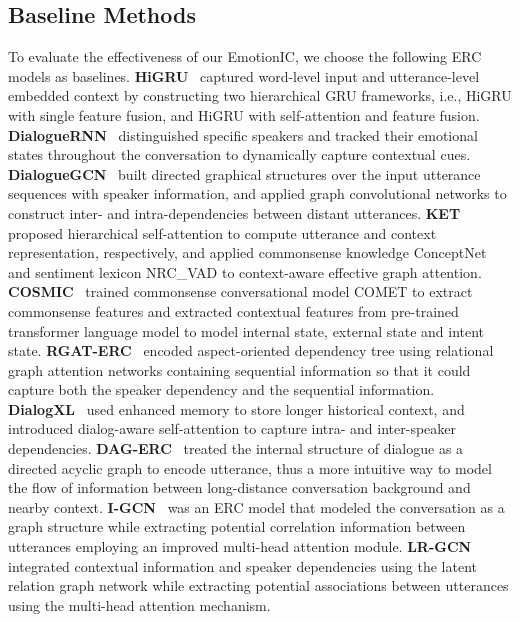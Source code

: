 \documentclass{SCIS2019}
\begin{document}
\subsection{Baseline Methods}
To evaluate the effectiveness of our EmotionIC, we choose the following ERC models as baselines.
\textbf{HiGRU}~\cite{jiao2019higru} captured word-level input and utterance-level embedded context by constructing two hierarchical GRU frameworks, i.e., HiGRU with single feature fusion, and HiGRU with self-attention and feature fusion.
\textbf{DialogueRNN}~\cite{majumder2019dialoguernn} distinguished specific speakers and tracked their emotional states throughout the conversation to dynamically capture contextual cues.
\textbf{DialogueGCN}~\cite{ghosal2019dialoguegcn} built directed graphical structures over the input utterance sequences with speaker information, and applied graph convolutional networks to construct inter- and intra-dependencies between distant utterances.
\textbf{KET}~\cite{zhong2019knowledge} proposed hierarchical self-attention to compute utterance and context representation, respectively, and applied commonsense knowledge ConceptNet and sentiment lexicon NRC\_VAD to context-aware effective graph attention.
\textbf{COSMIC}~\cite{Ghosal2020} trained commonsense conversational model COMET to extract commonsense features and extracted contextual features from pre-trained transformer language model to model internal state, external state and intent state.
\textbf{RGAT-ERC}~\cite{wang2020relational} encoded aspect-oriented dependency tree using relational graph attention networks containing sequential information so that it could capture both the speaker dependency and the sequential information.
\textbf{DialogXL}~\cite{shen2021dialogxl} used enhanced memory to store longer historical context, and introduced dialog-aware self-attention to capture intra- and inter-speaker dependencies.
\textbf{DAG-ERC}~\cite{shen-etal-2021-directed} treated the internal structure of dialogue as a directed acyclic graph to encode utterance, thus a more intuitive way to model the flow of information between long-distance conversation background and nearby context.
\textbf{I-GCN}~\cite{nie2022igcn} was an ERC model that modeled the conversation as a graph structure while extracting potential correlation information between utterances employing an improved multi-head attention module.
\textbf{LR-GCN}~\cite{ren2022lrgcn} integrated contextual information and speaker dependencies using the latent relation graph network while extracting potential associations between utterances using the multi-head attention mechanism.
\end{document}

